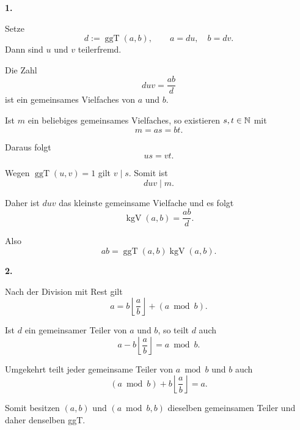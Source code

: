 \begin{myproof}
  \textbf{1.}

  Setze
  \[
    d:=\operatorname{ggT}(a,b),
    \qquad a=du,\quad b=dv.
  \]
  Dann sind $u$ und $v$ teilerfremd.

  Die Zahl
  \[
    duv=\frac{ab}{d}
  \]
  ist ein gemeinsames Vielfaches von
  $a$ und $b$.

  Ist $m$ ein beliebiges gemeinsames
  Vielfaches, so existieren $s,t\in\mathbb{N}$
  mit
  \[
    m=as=bt.
  \]

  Daraus folgt
  \[
    us=vt.
  \]

  Wegen $\operatorname{ggT}(u,v)=1$
  gilt $v\mid s$. Somit ist
  \[
    duv\mid m.
  \]

  Daher ist $duv$ das kleinste gemeinsame
  Vielfache und es folgt
  \[
    \operatorname{kgV}(a,b)=\frac{ab}{d}.
  \]

  Also
  \[
    ab=\operatorname{ggT}(a,b)
       \operatorname{kgV}(a,b).
  \]

  \medskip
  \textbf{2.}

  Nach der Division mit Rest gilt
  \[
    a=b\left\lfloor\frac ab\right\rfloor
      +(a\bmod b).
  \]

  Ist $d$ ein gemeinsamer Teiler von
  $a$ und $b$, so teilt $d$ auch
  \[
    a-b\left\lfloor\frac ab\right\rfloor
    =a\bmod b.
  \]

  Umgekehrt teilt jeder gemeinsame Teiler
  von $a\bmod b$ und $b$ auch
  \[
    (a\bmod b)
    +b\left\lfloor\frac ab\right\rfloor
    =a.
  \]

  Somit besitzen $(a,b)$ und
  $(a\bmod b,b)$ dieselben gemeinsamen
  Teiler und daher denselben ggT.
\end{myproof}



